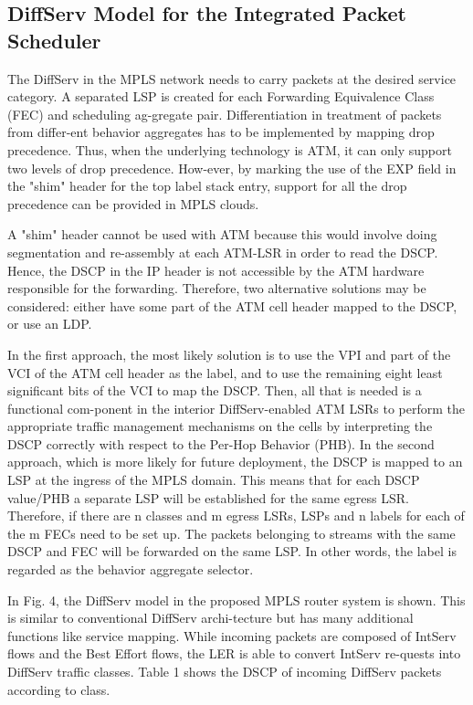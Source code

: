 \documentclass[10pt, twocolumn, twoside]{etri}
\begin{document}
\subsection{DiffServ Model for the Integrated Packet Scheduler}

The DiffServ in the MPLS network needs to carry packets at
the desired service category. A separated LSP is created for
each Forwarding Equivalence Class (FEC) and scheduling ag-gregate
pair. Differentiation in treatment of packets from differ-ent behavior
aggregates has to be implemented by mapping drop precedence. Thus, when
the underlying technology is ATM, it can only support two levels of
drop precedence. How-ever, by marking the use of the EXP field in the
"shim" header for the top label stack entry, support for all the drop
precedence can be provided in MPLS clouds.

A "shim" header cannot be used with ATM because this would involve
doing segmentation and re-assembly at each ATM-LSR in order to read
the DSCP. Hence, the DSCP in the IP header is not accessible by the
ATM hardware responsible for the forwarding. Therefore, two alternative
solutions may be considered: either have some part of the ATM cell header
mapped to the DSCP, or use an LDP.

In the first approach, the most likely solution is to use the VPI and part
of the VCI of the ATM cell header as the label, and to use the remaining
eight least significant bits of the VCI to map the DSCP. Then, all that
is needed is a functional com-ponent in the interior DiffServ-enabled
ATM LSRs to perform the appropriate traffic management mechanisms on
the cells by interpreting the DSCP correctly with respect to the Per-Hop
Behavior (PHB). In the second approach, which is more likely for future
deployment, the DSCP is mapped to an LSP at the ingress of the MPLS
domain. This means that for each DSCP value/PHB a separate LSP will be
established for the same egress LSR. Therefore, if there are n classes
and m egress LSRs,   LSPs and n labels for each of the m FECs need to
be set up. The packets belonging to streams with the same DSCP and FEC
will be forwarded on the same LSP. In other words, the label is regarded
as the behavior aggregate selector.

In Fig. 4, the DiffServ model in the proposed MPLS router system is
shown. This is similar to conventional DiffServ archi-tecture but has
many additional functions like service mapping. While incoming packets
are composed of IntServ flows and the Best Effort flows, the LER is
able to convert IntServ re-quests into DiffServ traffic classes. Table
1 shows the DSCP of incoming DiffServ packets according to class.
\end{document}
